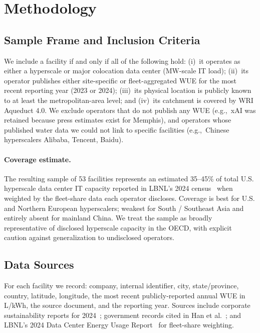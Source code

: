 \documentclass[conference,10pt]{IEEEtran}
\begin{document}
\section{Methodology}
\label{sec:methodology}

\subsection{Sample Frame and Inclusion Criteria}

We include a facility if and only if all of the following hold:
(i)~it operates as either a hyperscale or major colocation data center
(MW-scale IT load); (ii)~its operator publishes either site-specific or
fleet-aggregated WUE for the most recent reporting year (2023 or 2024);
(iii)~its physical location is publicly known to at least the
metropolitan-area level; and (iv)~its catchment is covered by WRI
Aqueduct 4.0. We exclude operators that do not publish any WUE
(e.g.,~xAI was retained because press estimates exist for Memphis), and
operators whose published water data we could not link to specific
facilities (e.g.,~Chinese hyperscalers Alibaba, Tencent, Baidu).

\paragraph{Coverage estimate.}
The resulting sample of 53 facilities represents an estimated 35--45\% of
total U.S. hyperscale data center IT capacity reported in LBNL's 2024
census~\cite{lbnl2024} when weighted by the fleet-share data each
operator discloses. Coverage is best for U.S. and Northern European
hyperscalers; weakest for South / Southeast Asia and entirely absent for
mainland China. We treat the sample as broadly representative of disclosed
hyperscale capacity in the OECD, with explicit caution against
generalization to undisclosed operators.

\subsection{Data Sources}

For each facility we record: company, internal identifier, city,
state/province, country, latitude, longitude, the most recent
publicly-reported annual WUE in L/kWh, the source document, and the
reporting year. Sources include corporate sustainability reports for
2024~\cite{google2025envreport, microsoft2024sustain, meta2025sustain,
amazon2024aws, equinix2024sustain, digitalrealty2024impact,
qts2024sustain}; government records cited in
Han et al.~\cite{han2026}; and LBNL's 2024 Data Center Energy Usage
Report~\cite{lbnl2024} for fleet-share weighting.
\end{document}
